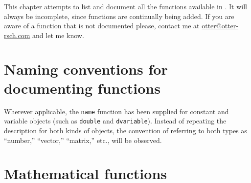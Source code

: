 %
%

This chapter attempts to list and document all the functions
available in \ADM. It will always be incomplete, since functions are
continually being added. If you are aware of a function that is
not documented please, contact me at \href{mailto:otter@otter-rsch.com}{otter@otter-rsch.com} and
let me know.


\section{Naming conventions for documenting functions}

Wherever applicable, the \texttt{name} function has been supplied for
constant and variable objects (such as \texttt{double} and \texttt{dvariable}).
Instead of repeating the description for both kinds of objects,
the convention of referring to both types as ``number,'' ``vector,''
``matrix,'' etc., will be observed.


\section{Mathematical functions}

